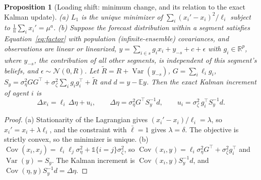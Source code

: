 \documentclass[10pt]{article}
\newtheorem{proposition}{Proposition}
\theoremstyle{remark}
\newcommand{\R}{\mathbb{R}}
\newcommand{\E}{\mathbb{E}}
\newcommand{\Var}{\operatorname{Var}}
\newcommand{\Cov}{\operatorname{Cov}}
\begin{document}
\begin{proposition}[Loading shift: minimum change, and its relation to the exact Kalman update]
\label{prop:lift}
(a) $L_1$ is the unique minimizer of $\sum_i (x_i'-x_i)^2/\ell_i$ subject to $\frac1n\sum_i x_i' = \mu^a$.
(b) Suppose the forecast distribution within a segment satisfies Equation~\eqref{eq:factor} with population (infinite-ensemble) covariances, and observations are linear or linearized, $y=\sum_{i\in s} g_i x_i + y_{-s} + c + \epsilon$ with $g_i\in\R^p$, where $y_{-s}$, the contribution of all other segments, is independent of this segment's beliefs, and $\epsilon\sim\mathcal{N}(0,R)$. Let $\tilde R=R+\Var(y_{-s})$, $G=\sum_i \ell_i g_i$, $S_y=\sigma_\eta^2GG^\top+\sigma_\zeta^2\sum_i g_ig_i^\top+\tilde R$ and $d=y-\E y$. Then the exact Kalman increment of agent $i$ is
\begin{equation}
\Delta x_i = \ell_i\,\Delta\eta + u_i,\qquad \Delta\eta=\sigma_\eta^2G^\top S_y^{-1}d,\qquad u_i=\sigma_\zeta^2\,g_i^\top S_y^{-1}d .
\end{equation}
\end{proposition}
\begin{proof}
(a) Stationarity of the Lagrangian gives $(x_i'-x_i)/\ell_i=\lambda$, so $x_i'=x_i+\lambda\ell_i$, and the constraint with $\bar\ell=1$ gives $\lambda=\delta$. The objective is strictly convex, so the minimizer is unique. (b) $\Cov(x_i,x_j)=\ell_i\ell_j\sigma_\eta^2+\mathbb{1}\{i=j\}\sigma_\zeta^2$, so $\Cov(x_i,y)=\ell_i\sigma_\eta^2G^\top+\sigma_\zeta^2g_i^\top$ and $\Var(y)=S_y$. The Kalman increment is $\Cov(x_i,y)S_y^{-1}d$, and $\Cov(\eta,y)S_y^{-1}d=\Delta\eta$.
\end{proof}
\end{document}

